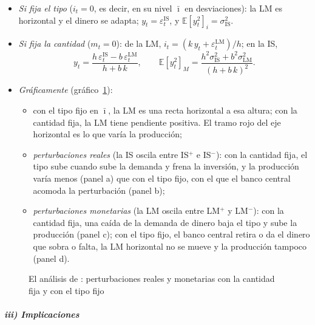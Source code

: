 \documentclass[11pt]{article}
\begin{document}
\begin{itemize}
\item \emph{Si fija el tipo} ($i_t=0$, es decir, en su nivel $\bar\imath$ en desviaciones): la LM es horizontal y el dinero se adapta; $y_t=\varepsilon^{\mathrm{IS}}_t$, y $\mathbb{E}[y_t^2]_i=\sigma^2_{\mathrm{IS}}$.
\item \emph{Si fija la cantidad} ($m_t=0$): de la LM, $i_t=(k\,y_t+\varepsilon^{\mathrm{LM}}_t)/h$; en la IS,
  $$y_t=\frac{h\,\varepsilon^{\mathrm{IS}}_t-b\,\varepsilon^{\mathrm{LM}}_t}{h+b\,k},\qquad \mathbb{E}[y_t^2]_M=\frac{h^2\sigma^2_{\mathrm{IS}}+b^2\sigma^2_{\mathrm{LM}}}{(h+b\,k)^2} .$$
\item \emph{Gráficamente} (gráfico~\ref{fig:poole}):
  \begin{itemize}
  \item con el tipo fijo en $\bar\imath$, la LM es una recta horizontal a esa altura; con la cantidad fija, la LM tiene pendiente positiva. El tramo rojo del eje horizontal es lo que varía la producción;
  \item \emph{perturbaciones reales} (la IS oscila entre IS$^+$ e IS$^-$): con la cantidad fija, el tipo sube cuando sube la demanda y frena la inversión, y la producción varía menos (panel a) que con el tipo fijo, con el que el banco central acomoda la perturbación (panel b);
  \item \emph{perturbaciones monetarias} (la LM oscila entre LM$^+$ y LM$^-$): con la cantidad fija, una caída de la demanda de dinero baja el tipo y sube la producción (panel c); con el tipo fijo, el banco central retira o da el dinero que sobra o falta, la LM horizontal no se mueve y la producción tampoco (panel d).
  \end{itemize}
\end{itemize}

\begin{figure}[H]
\centering
\caption{El análisis de : perturbaciones reales y monetarias con la cantidad fija y con el tipo fijo}\label{fig:poole}
\end{figure}

\subparagraph{iii) Implicaciones}
\end{document}
